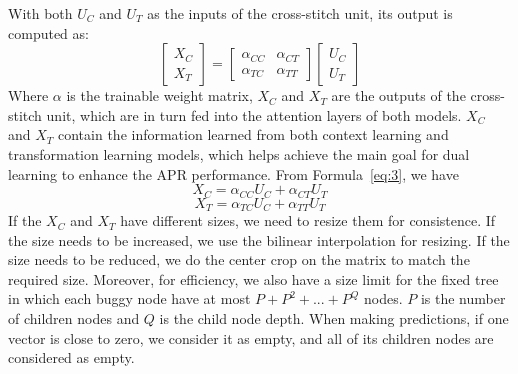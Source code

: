 With both $U_C$ and $U_T$ as the inputs of the cross-stitch unit, its
output is computed as:
\begin{equation}\label{eq:3}
	\begin{bmatrix}
		X_C\\
		X_T
	\end{bmatrix}
	=
	\begin{bmatrix}
		\alpha_{CC} &  \alpha_{CT} \\
		\alpha_{TC} &  \alpha_{TT}
	\end{bmatrix}
	\begin{bmatrix}
		U_C\\
		U_T
	\end{bmatrix}
\end{equation}
Where $\alpha$ is the trainable weight matrix, $X_C$ and $X_T$ are the
outputs of the cross-stitch unit, which are in turn fed into the
attention layers of both models. $X_C$ and $X_T$ contain the
information learned from both context learning and transformation
learning models, which helps achieve the main goal for dual learning
to enhance the APR performance. From Formula~\ref{eq:3}, we have
\begin{equation}\label{eq:4}
	X_C = \alpha_{CC}U_C + \alpha_{CT}U_T
\end{equation}
\begin{equation}\label{eq:5}
	X_T = \alpha_{TC}U_C + \alpha_{TT}U_T
\end{equation}
If the $X_C$ and $X_T$ have different sizes, we need to resize them
for consistence. If the size needs to be increased, we use the
bilinear interpolation for resizing. If the size needs to be reduced,
we do the center crop on the matrix to match the required
size. Moreover, for efficiency, we also have a size limit for the
fixed tree in which each buggy node have at most $P+P^2+...+P^Q$
nodes.  $P$ is the number of children nodes and $Q$ is the child node
depth. When making predictions, if one vector is close to zero, we consider
it as empty, and all of its children nodes are considered as empty.


